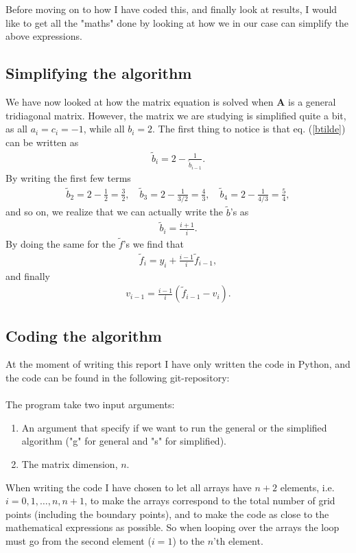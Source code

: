 \documentclass[12pt, a4paper]{article}
\begin{document}
Before moving on to how I have coded this, and finally look at results, I would like to get all the 
"maths" done by looking at how we in our case can simplify the above expressions.    

\subsection{Simplifying the algorithm}

We have now looked at how the matrix equation is solved when $\mathbf{A}$ is a general tridiagonal matrix. 
However, the matrix we are studying is simplified quite a bit, as all $a_i = c_i = -1$, while 
all $b_i = 2$. The first thing to notice is that eq. (\ref{btilde}) can be written as 
\begin{align*}
\tilde{b}_i = 2- \frac{1}{\tilde{b}_{i-1}}. 
\end{align*}
By writing the first few terms 
\begin{align*}
\tilde{b}_2 = 2 - \frac{1}{2} = \frac{3}{2}, \quad \tilde{b}_3 = 2- \frac{1}{3/2} = \frac{4}{3}, \quad 
\tilde{b}_4 = 2 - \frac{1}{4/3} = \frac{5}{4}, 
\end{align*}
and so on, we realize that we can actually write the $\tilde{b}$'s as 
\begin{align*}
\tilde{b}_i = \frac{i+1}{i}. 
\end{align*}
By doing the same for the $\tilde{f}$'s we find that 
\begin{align*}
\tilde{f}_i = y_i + \frac{i-1}{i}\tilde{f}_{i-1}, 
\end{align*}
and finally 
\begin{align*}
v_{i-1} = \frac{i-1}{i}(\tilde{f}_{i-1} - v_i). 
\end{align*}

\subsection{Coding the algorithm}

At the moment of writing this report I have only written the code in Python, and the code can be found in 
the following git-repository: \vspace{0.5cm} \\ 
 \vspace{0.5cm} \\ 
The program take two input arguments: 
\begin{enumerate}
\item An argument that specify if we want to run the general or the simplified algorithm ("g" for 
general and "s" for simplified). 
\item The matrix dimension, $n$. 
\end{enumerate}  

When writing the code I have chosen to let all arrays have $n+2$ elements, i.e. $i = 0,1,\dots,n,n+1$, to 
make the arrays correspond to the total number of grid points (including the boundary points), and 
to make the code as close to the mathematical expressions as possible. So 
when looping over the arrays the loop must go from the second element ($i=1$) to the $n$'th element. 
\end{document}
